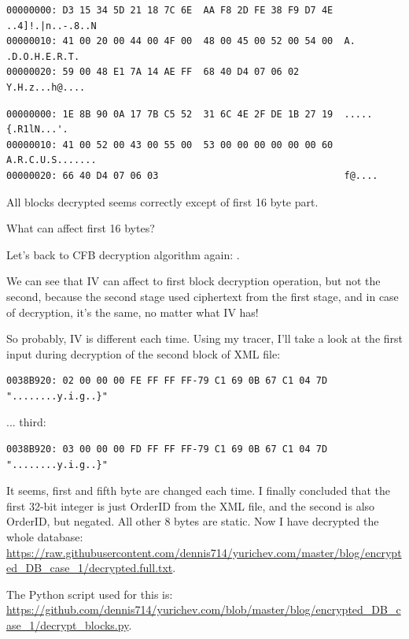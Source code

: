 \begin{lstlisting}
00000000: D3 15 34 5D 21 18 7C 6E  AA F8 2D FE 38 F9 D7 4E  ..4]!.|n..-.8..N
00000010: 41 00 20 00 44 00 4F 00  48 00 45 00 52 00 54 00  A. .D.O.H.E.R.T.
00000020: 59 00 48 E1 7A 14 AE FF  68 40 D4 07 06 02        Y.H.z...h@....
\end{lstlisting}

\begin{lstlisting}
00000000: 1E 8B 90 0A 17 7B C5 52  31 6C 4E 2F DE 1B 27 19  .....{.R1lN...'.
00000010: 41 00 52 00 43 00 55 00  53 00 00 00 00 00 00 60  A.R.C.U.S.......
00000020: 66 40 D4 07 06 03                                 f@....
\end{lstlisting}

All blocks decrypted seems correctly except of first 16 byte part.


What can affect first 16 bytes?

Let's back to CFB decryption algorithm again: .

We can see that IV can affect to first block decryption operation, but not the second,
because the second stage used ciphertext from the first stage, and in case of decryption,
it's the same, no matter what IV has!

So probably, IV is different each time.
Using my tracer, I'll take a look at the first input during decryption of the second block
of XML file:

\begin{lstlisting}
0038B920: 02 00 00 00 FE FF FF FF-79 C1 69 0B 67 C1 04 7D "........y.i.g..}"
\end{lstlisting}

... third:

\begin{lstlisting}
0038B920: 03 00 00 00 FD FF FF FF-79 C1 69 0B 67 C1 04 7D "........y.i.g..}"
\end{lstlisting}

It seems, first and fifth byte are changed each time.
I finally concluded that the first 32-bit integer is just OrderID from the XML file,
and the second is also OrderID, but negated. All other 8 bytes are static.
Now I have decrypted the whole database: 
\url{https://raw.githubusercontent.com/dennis714/yurichev.com/master/blog/encrypted_DB_case_1/decrypted.full.txt}.

The Python script used for this is: 
\url{https://github.com/dennis714/yurichev.com/blob/master/blog/encrypted_DB_case_1/decrypt_blocks.py}.

